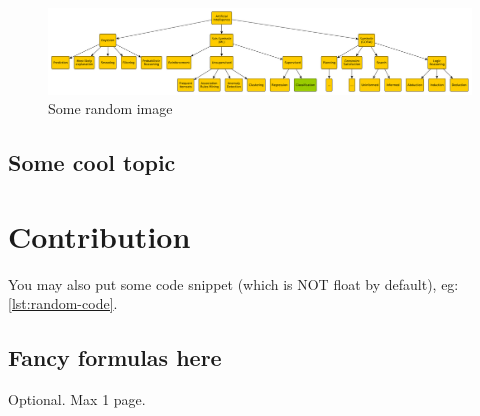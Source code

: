 \documentclass[12pt,a4paper,openright,twoside]{book}
\begin{document}
\begin{figure}
    \centering
    \includegraphics[width=0.8\linewidth]{figures/random-image.pdf}
    \caption{Some random image}
    \label{fig:random-image}
\end{figure}

\section{Some cool topic}

\chapter{Contribution}

You may also put some code snippet (which is NOT float by default), eg: \cref{lst:random-code}.



\section{Fancy formulas here}


\backmatter

\nocite{*} %
\printglossary[type=\acronymtype]
\printglossary
\printbibliography

\begin{acknowledgements} %
Optional. Max 1 page.
\end{acknowledgements}
\end{document}
